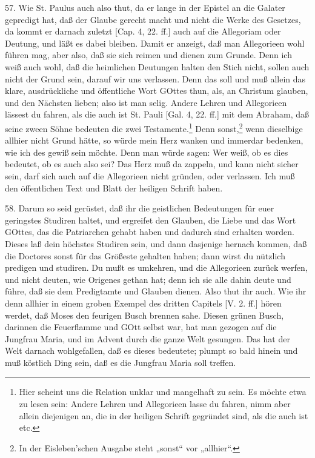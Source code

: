 57. Wie St. Paulus auch also thut, da er lange in der Epistel an die Galater gepredigt hat, daß der Glaube gerecht macht und nicht die Werke des Gesetzes, da kommt er darnach zuletzt [Cap. 4, 22. ff.] auch auf die Allegoriam oder Deutung, und läßt es dabei bleiben. Damit er anzeigt, daß man Allegorieen wohl führen mag, aber also, daß sie sich reimen und dienen zum Grunde. Denn ich weiß auch wohl, daß die heimlichen Deutungen halten den Stich nicht, sollen auch nicht der Grund sein, darauf wir uns verlassen. Denn das soll und muß allein das klare, ausdrückliche und öffentliche Wort GOttes thun, als, an Christum glauben, und den Nächsten lieben; also ist man selig. Andere Lehren und Allegorieen lässest du fahren, als die auch ist St. Pauli [Gal. 4, 22. ff.] mit dem Abraham, daß seine zween Söhne bedeuten die
zwei Testamente.\footnote{Hier scheint uns die Relation unklar und mangelhaft zu sein. Es möchte etwa zu lesen sein: Andere Lehren und Allegorieen lasse du fahren, nimm aber allein diejenigen an, die in der heiligen Schrift gegründet sind, als die auch ist etc.} Denn sonst,\footnote{In der Eisleben’schen Ausgabe steht „sonst“ vor „allhier“.} wenn dieselbige allhier nicht Grund hätte, so würde mein Herz wanken und immerdar bedenken, wie ich des gewiß sein möchte. Denn man würde sagen: Wer weiß, ob es dies bedeutet, ob es auch also sei? Das Herz muß da zappeln, und kann nicht sicher sein, darf sich auch auf die Allegorieen nicht gründen, oder verlassen. Ich muß den öffentlichen Text und Blatt der heiligen Schrift haben.

58. Darum so seid gerüstet, daß ihr die geistlichen Bedeutungen für euer geringstes Studiren haltet, und ergreifet den Glauben, die Liebe und das Wort GOttes, das die Patriarchen gehabt haben und dadurch sind erhalten worden. Dieses laß dein höchstes Studiren sein, und dann dasjenige hernach kommen, daß die Doctores sonst für das Größeste gehalten haben; dann wirst du nützlich predigen und studiren. Du mußt es umkehren, und die Allegorieen zurück werfen, und nicht deuten, wie Origenes gethan hat; denn ich sie alle dahin deute und führe, daß sie dem Predigtamte und Glauben dienen. Also thut ihr auch. Wie ihr denn allhier in einem groben Exempel des dritten Capitels [V. 2. ff.] hören werdet, daß Moses den feurigen Busch brennen sahe. Diesen grünen Busch, darinnen die Feuerflamme und GOtt selbst war, hat man gezogen auf die Jungfrau Maria, und im Advent durch die ganze Welt gesungen. Das hat der Welt darnach wohlgefallen, daß es dieses bedeutete; plumpt so bald hinein und muß köstlich Ding sein, daß es die Jungfrau Maria soll treffen.

